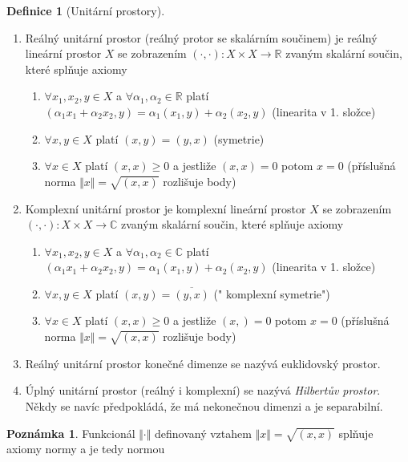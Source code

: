 \documentclass[a4]{report}
\theoremstyle{definition}
\newtheorem{definition}{Definice}[section]
\newtheorem{notes}{Poznámka}[section]
\begin{document}
{\begin{definition}[Unitární prostory] 


 \begin{enumerate}
	\item Reálný unitární prostor (reálný protor se skalárním součinem) je reálný lineární prostor $X$ se zobrazením $ (\cdot,\cdot): X \times X \rightarrow \mathbb{R}$ zvaným skalární součin, které splňuje axiomy \begin{enumerate}
	\item $\forall x_1,x_2,y \in X$ a $\forall \alpha_1,\alpha_2 \in \mathbb{R}$ platí $(\alpha_1x_1+\alpha_2 x_2,y)=\alpha_1 (x_1,y) + \alpha_2 (x_2,y)$ (linearita v 1. složce)
	\item $\forall x,y \in X$ platí $ (x,y) = (y,x)$ (symetrie)
	\item $\forall x \in X$ platí $(x,x)\geq 0$ a jestliže $(x,x) =0$ potom $x=0$ (příslušná norma $\Vert x \Vert = \sqrt{(x,x)}$ rozlišuje body)
 \end{enumerate} 
\item Komplexní unitární prostor je komplexní lineární prostor $X$ se zobrazením $ (\cdot,\cdot): X \times X \rightarrow \mathbb{C}$ zvaným skalární součin, které splňuje axiomy \begin{enumerate}
 	\item $\forall x_1,x_2,y \in X$ a $\forall \alpha_1,\alpha_2 \in \mathbb{C}$ platí $(\alpha_1x_1+\alpha_2 x_2,y)=\alpha_1 (x_1,y) + \alpha_2 (x_2,y)$ (linearita v 1. složce)
	\item $\forall x,y \in X$ platí $ (x,y) = \overline{(y,x)}$ (" komplexní symetrie")
	\item $\forall x \in X$ platí $(x,x)\geq 0$ a jestliže $(x,) =0$ potom $x=0$ (příslušná norma $\Vert x \Vert = \sqrt{(x,x)}$ rozlišuje body)
 \end{enumerate}
 \item Reálný unitární prostor konečné dimenze se nazývá euklidovský prostor.
 \item Úplný unitární prostor (reálný i komplexní) se nazývá \textit{Hilbertův prostor}. Někdy se navíc předpokládá, že má nekonečnou dimenzi a je separabilní.
\end{enumerate}

\end{definition}

\begin{notes}
	Funkcionál $\Vert \cdot \Vert$ definovaný vztahem $\Vert x \Vert= \sqrt{(x,x)}$ splňuje axiomy normy a je tedy normou
\end{notes}

}
\end{document}
